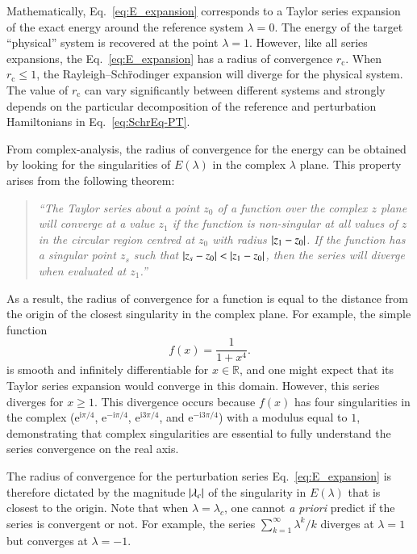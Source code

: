 \documentclass[aps,prb,reprint,noshowkeys,superscriptaddress]{revtex4-1}
\renewcommand{\i}{\mathrm{i}} %
\newcommand{\e}{\mathrm{e}} %
\newcommand{\rc}{r_{\text{c}}}
\begin{document}
Mathematically, Eq.~\eqref{eq:E_expansion} corresponds to a Taylor series expansion of the exact energy
around the reference system $\lambda = 0$.
The energy of the target ``physical'' system is recovered at the point $\lambda = 1$.
However, like all series expansions, the Eq.~\eqref{eq:E_expansion} has a radius of convergence $\rc$. 
When $\rc \le 1$, the Rayleigh--Sch\"{r}odinger expansion will diverge
for the physical system.
The value of $\rc$ can vary significantly between different systems and strongly depends on the particular decomposition
of the reference and perturbation Hamiltonians in Eq.~\eqref{eq:SchrEq-PT}.\cite{Mihalka_2017b}

From complex-analysis, \cite{BenderBook} the radius of convergence for the energy can be obtained by looking for the 
singularities of $E(\lambda)$ in the complex $\lambda$ plane.
This property arises from the following theorem: \cite{Goodson_2011}
\begin{quote}
\it
``The Taylor series about a point $z_0$ of a function over the complex $z$ plane will converge at a value $z_1$ 
if the function is non-singular at all values of $z$ in the circular region centred at $z_0$ with radius $\abs{z_1-z_0}$. 
If the function has a singular point $z_s$ such that $\abs{z_s-z_0} < \abs{z_1-z_0}$, 
then the series will diverge when evaluated at $z_1$.''
\end{quote}
As a result, the radius of convergence for a function is equal to the distance from the origin of the closest singularity
in the complex plane.
For example, the simple function
\begin{equation} \label{eq:DivExample}
	f(x)=\frac{1}{1+x^4}.
\end{equation}
is smooth and infinitely differentiable for $x \in \mathbb{R}$, and one might expect that its Taylor series expansion would 
converge in this domain.
However, this series diverges for $x \ge 1$.
This divergence occurs because $f(x)$ has four singularities in the complex 
($\e^{\i\pi/4}$, $\e^{-\i\pi/4}$, $\e^{\i3\pi/4}$, and $\e^{-\i3\pi/4}$) with a modulus equal to $1$, demonstrating
that complex singularities are essential to fully understand the series convergence on the real axis.\cite{BenderBook}

The radius of convergence for the perturbation series Eq.~\eqref{eq:E_expansion} is therefore dictated by the magnitude $\abs{\lambda_c}$ of the
singularity in $E(\lambda)$ that is closest to the origin.
Note that when $\lambda = \lambda_c$, one cannot \textit{a priori} predict if the series is convergent or not.
For example, the series $\sum_{k=1}^\infty \lambda^k/k$ diverges at $\lambda = 1$ but converges at $\lambda = -1$.
\end{document}
